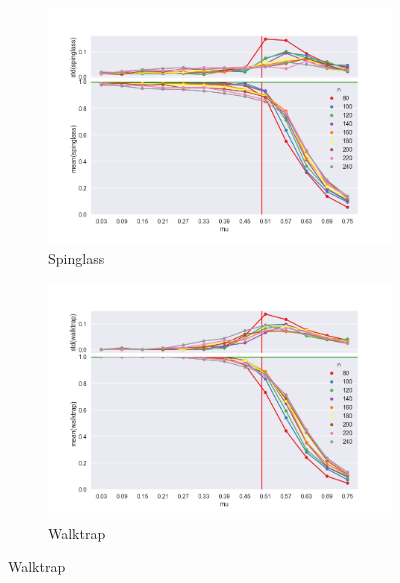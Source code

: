 \begin{figure}
    \begin{subfigure}[b]{0.32\textwidth}
        \includegraphics[width=\textwidth]{fig/ami_vs_mu_spinglass}
        \caption{Spinglass}
        \label{fig:gull}
    \end{subfigure}
    \qquad
    \begin{subfigure}[b]{0.32\textwidth}
        \includegraphics[width=\textwidth]{fig/ami_vs_mu_walktrap}
        \caption{Walktrap}
        \label{fig:tiger}
    \end{subfigure}
    

\end{figure}
